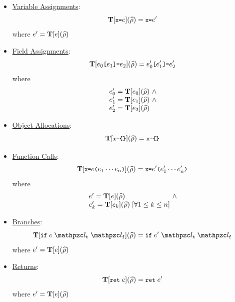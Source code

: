 \begin{itemize}
  \item \underline{Variable Assignments}:
    \[
      \textbf{T}[{\small \texttt{x}} {\small \texttt{=}} e](\widehat{\rho}) =
      {\small \texttt{x}} {\small \texttt{=}} e'
    \]
    where $e' = \textbf{T}[e](\widehat{\rho})$

  \item \underline{Field Assignments}:
    \[
      \textbf{T}[e_0 {\small \texttt{[}} e_1 {\small \texttt{]}} {\small \texttt{=}} e_2](\widehat{\rho}) =
      e'_0 {\small \texttt{[}} e'_1 {\small \texttt{]}} {\small \texttt{=}} e'_2
    \]
    where
    \[
      \begin{array}{l@{~}c@{~}ll}
        \expr'_0 = \transform{\expr_0}(\aenv) &\wedge\\
        \expr'_1 = \transform{\expr_1}(\aenv) &\wedge\\
        \expr'_2 = \transform{\expr_2}(\aenv)\\
      \end{array}
    \]
  \item \underline{Object Allocations}:
    \[
      \textbf{T}[{\small \texttt{x}} {\small \texttt{=}} {\small \texttt{\{}} {\small \texttt{\}}}](\widehat{\rho}) =
      {\small \texttt{x}} {\small \texttt{=}} {\small \texttt{\{}} {\small \texttt{\}}}
    \]

  \item \underline{Function Calls}:
    \[
      \textbf{T}[{\small \texttt{x}} {\small \texttt{=}} e {\small \texttt{(}} e_1 \cdots e_n {\small \texttt{)}}](\widehat{\rho}) =
      {\small \texttt{x}} {\small \texttt{=}} e' {\small \texttt{(}} e'_1 \cdots e'_n {\small \texttt{)}}
    \]
    where
    \[
      \begin{array}{l@{~}c@{~}ll}
        \expr' = \transform{\expr}(\aenv) &\wedge\\
        \expr'_k = \transform{\expr_k}(\aenv) \; [\forall 1 \leq k \leq
        n]\\
      \end{array}
    \]

  \item \underline{Branches}:
    \[
      \transform{\kwif \; \expr \; \lab_\vart \; \lab_\varf}(\aenv) =
      \kwif \; \expr' \; \lab_\vart \; \lab_\varf
    \]
    where $e' = \textbf{T}[e](\widehat{\rho})$

  \item \underline{Returns}:
    \[
      \textbf{T}[{\small \texttt{ret}} \; e](\widehat{\rho}) =
      {\small \texttt{ret}} \; e'
    \]
    where $e' = \textbf{T}[e](\widehat{\rho})$
\end{itemize}

